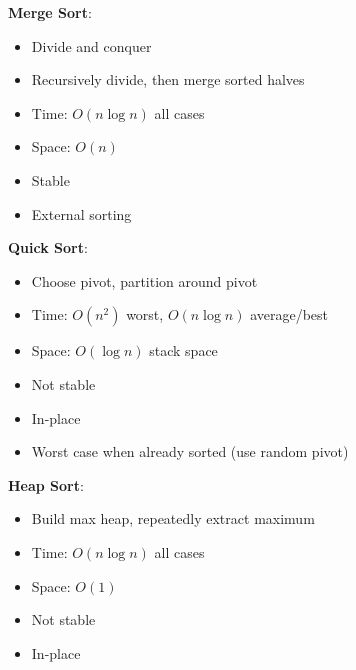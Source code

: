 \documentclass[12pt,a4paper]{report}
\begin{document}
\begin{concept}
\textbf{Merge Sort}:
\begin{itemize}
    \item Divide and conquer
    \item Recursively divide, then merge sorted halves
    \item Time: $O(n \log n)$ all cases
    \item Space: $O(n)$
    \item Stable
    \item External sorting
\end{itemize}

\textbf{Quick Sort}:
\begin{itemize}
    \item Choose pivot, partition around pivot
    \item Time: $O(n^2)$ worst, $O(n \log n)$ average/best
    \item Space: $O(\log n)$ stack space
    \item Not stable
    \item In-place
    \item Worst case when already sorted (use random pivot)
\end{itemize}

\textbf{Heap Sort}:
\begin{itemize}
    \item Build max heap, repeatedly extract maximum
    \item Time: $O(n \log n)$ all cases
    \item Space: $O(1)$
    \item Not stable
    \item In-place
\end{itemize}
\end{concept}
\end{document}
